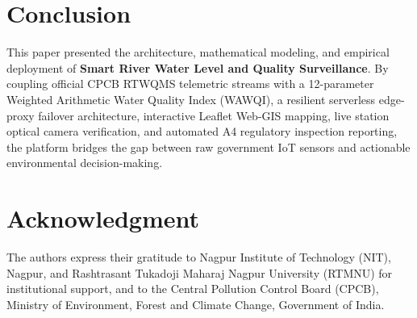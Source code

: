 \documentclass[conference]{IEEEtran}
\begin{document}
\section{Conclusion}
This paper presented the architecture, mathematical modeling, and empirical deployment of \textbf{Smart River Water Level and Quality Surveillance}. By coupling official CPCB RTWQMS telemetric streams with a 12-parameter Weighted Arithmetic Water Quality Index (WAWQI), a resilient serverless edge-proxy failover architecture, interactive Leaflet Web-GIS mapping, live station optical camera verification, and automated A4 regulatory inspection reporting, the platform bridges the gap between raw government IoT sensors and actionable environmental decision-making.

\section*{Acknowledgment}
The authors express their gratitude to Nagpur Institute of Technology (NIT), Nagpur, and Rashtrasant Tukadoji Maharaj Nagpur University (RTMNU) for institutional support, and to the Central Pollution Control Board (CPCB), Ministry of Environment, Forest and Climate Change, Government of India.
\end{document}

